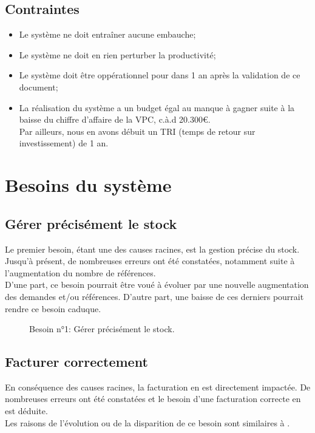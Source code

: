 \documentclass{article}
\begin{document}
\subsection{Contraintes}
\begin{itemize}
	\item Le système ne doit entraîner aucune embauche;
	\item Le système ne doit en rien perturber la productivité;
	\item Le système doit être oppérationnel pour dans 1 an après la validation
	de ce document;
	\item La réalisation du système a un budget égal au manque à gagner suite à
	la baisse du chiffre d'affaire de la VPC, c.à.d 20.300€.\\
	Par ailleurs, nous en avons débuit un TRI (temps de retour sur
	investissement) de 1 an.
\end{itemize}

\section{Besoins du système}

\subsection{Gérer précisément le stock}\label{cat:besoin:stock}
Le premier besoin, étant une des causes racines, est la gestion précise du
stock. Jusqu'à présent, de nombreuses erreurs ont été constatées, notamment
suite à l'augmentation du nombre de références.
\medskip\\
D'une part, ce besoin pourrait être voué à évoluer par une nouvelle augmentation
des demandes et/ou références. D'autre part, une baisse de ces derniers pourrait
rendre ce besoin caduque.

\begin{figure}[hbt!]
	\centering
	
	\caption{
		Besoin n°1: Gérer précisément le stock.
	}
\end{figure}
\FloatBarrier

\subsection{Facturer correctement}\label{cat:besoin:facturer}
En conséquence des causes racines, la facturation en est directement impactée.
De nombreuses erreurs ont été constatées et le besoin d'une facturation
correcte en est déduite.
\medskip\\
Les raisons de l'évolution ou de la disparition de ce besoin sont similaires
à .
\end{document}

